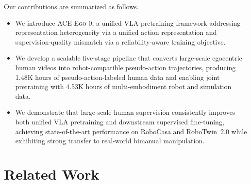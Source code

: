 \documentclass{article}
\newcommand{\OURS}{\textsc{ACE-Ego-0}\xspace}
\newcommand{\Ours}{\OURS}
\begin{document}
Our contributions are summarized as follows.
\begin{itemize}
    \item We introduce \Ours, a unified VLA pretraining framework addressing representation heterogeneity via a unified action representation and supervision-quality mismatch via a reliability-aware training objective.
    \item We develop a scalable five-stage pipeline that converts large-scale egocentric human videos into robot-compatible pseudo-action trajectories, producing 1.48K hours of pseudo-action-labeled human data and enabling joint pretraining with 4.53K hours of multi-embodiment robot and simulation data.
    \item We demonstrate that large-scale human supervision consistently improves both unified VLA pretraining and downstream supervised fine-tuning, achieving state-of-the-art performance on RoboCasa and RoboTwin~2.0 while exhibiting strong transfer to real-world bimanual manipulation.
\end{itemize}


\section{Related Work}
\end{document}
